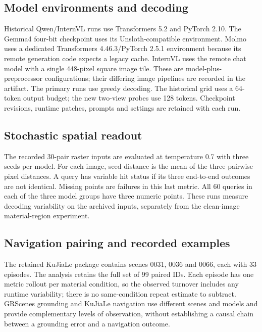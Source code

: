 \subsection{Model environments and decoding}
Historical Qwen/InternVL runs use Transformers 5.2 and PyTorch 2.10. The
Gemma4 four-bit checkpoint uses its Unsloth-compatible environment. Molmo uses
a dedicated Transformers 4.46.3/PyTorch 2.5.1 environment because its remote
generation code expects a legacy cache. InternVL uses the remote chat model
with a single 448-pixel square image tile. These are model-plus-preprocessor
configurations; their differing image pipelines are recorded in the artifact.
The primary runs use greedy decoding. The historical grid uses a 64-token
output budget; the new two-view probes use 128 tokens. Checkpoint revisions,
runtime patches, prompts and settings are retained with each run.

\subsection{Stochastic spatial readout}
The recorded 30-pair raster inputs are evaluated at temperature 0.7 with three
seeds per model. For each image, seed distance is the mean of the three
pairwise pixel distances. A query has variable hit status if its three
end-to-end outcomes are not identical. Missing points are failures in this
last metric. All 60 queries in each of the three model groups have three
numeric points. These runs measure decoding variability on the archived
inputs, separately from the clean-image material-region experiment.

\begin{table}[htbp]
\centering\small

\caption{Stochastic readout on identical images, recomputed from the saved
three-seed predictions. Complete triples count queries with three numeric points.}
\label{tab:sampling}
\end{table}

\subsection{Navigation pairing and recorded examples}
The retained KuJiaLe package contains scenes 0031, 0036 and 0066, each with
33 episodes. The analysis retains the full set of 99 paired IDs. Each episode has one metric rollout per material condition, so the observed
turnover includes any runtime variability; there is no same-condition repeat
estimate to subtract. GRScenes grounding and KuJiaLe navigation use different
scenes and models and provide complementary levels of observation, without
establishing a causal chain between a grounding error and a navigation outcome.

